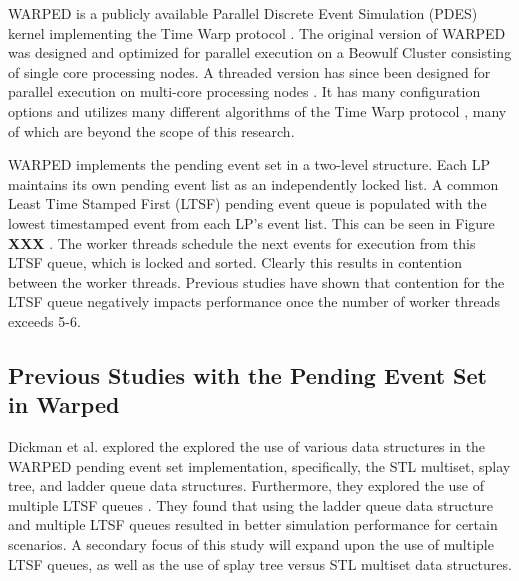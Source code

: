 \documentclass[a4paper]{article}
\begin{document}
\indent WARPED is a publicly available Parallel Discrete Event Simulation (PDES)
kernel implementing the Time Warp protocol \cite{martin}.  The original version
of WARPED was designed and optimized for parallel execution on a Beowulf Cluster
consisting of single core processing nodes.  A threaded version has since been
designed for parallel execution on multi-core processing nodes \cite{muthalagu}.
It has many configuration options and utilizes many different algorithms of the
Time Warp protocol \cite{fujimoto}, many of which are beyond the scope of this
research.\par

\indent WARPED implements the pending event set in a two-level structure. Each
LP maintains its own pending event list as an independently locked list.  A
common Least Time Stamped First (LTSF) pending event queue is populated with the
lowest timestamped event from each LP's event list.  This can be seen in Figure
\textbf{XXX} \cite{dickman}.  The worker threads schedule the next events for
execution from this LTSF queue, which is locked and sorted. Clearly this results
in contention between the worker threads.  Previous studies have shown that
contention for the LTSF queue negatively impacts performance once the number of
worker threads exceeds 5-6.


\subsection{\textbf{Previous Studies with the Pending Event Set in Warped}}

\indent Dickman et al. explored the explored the use of various data structures
in the WARPED pending event set implementation, specifically, the STL multiset,
splay tree, and ladder queue data structures. Furthermore, they explored the use
of multiple LTSF queues \cite{dickman}.  They found that using the ladder queue
data structure and multiple LTSF queues resulted in better simulation
performance for certain scenarios.  A secondary focus of this study will expand
upon the use of multiple LTSF queues, as well as the use of splay tree versus 
STL multiset data structures.\par
\end{document}
